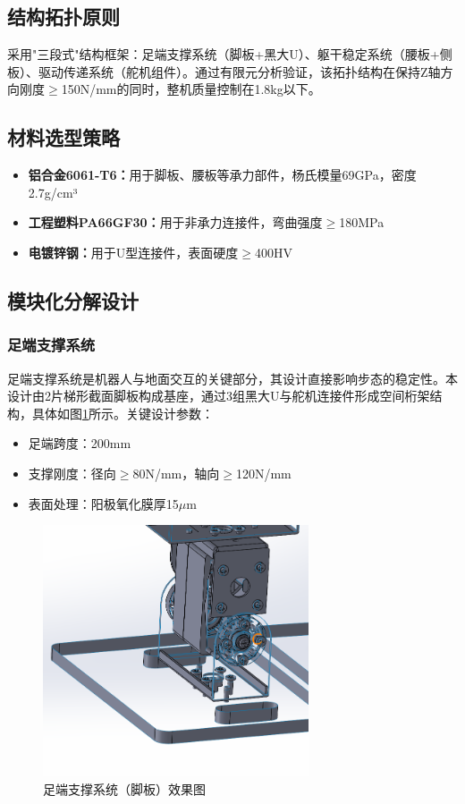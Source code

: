\documentclass[a4paper,fontset=windows]{ctexart}
\providecommand{\tightlist}{%
  \setlength{\itemsep}{0pt}\setlength{\parskip}{0pt}}
\begin{document}
\subsection{结构拓扑原则}
采用"三段式"结构框架：足端支撑系统（脚板+黑大U）、躯干稳定系统（腰板+侧板）、驱动传递系统（舵机组件）。通过有限元分析验证，该拓扑结构在保持Z轴方向刚度$\geq$150N/mm的同时，整机质量控制在1.8kg以下。
\subsection{材料选型策略}
\begin{itemize}
    \tightlist
    \item \textbf{铝合金6061-T6：}用于脚板、腰板等承力部件，杨氏模量69GPa，密度2.7g/cm³
    \item \textbf{工程塑料PA66GF30：}用于非承力连接件，弯曲强度$\geq$180MPa
    \item \textbf{电镀锌钢：}用于U型连接件，表面硬度$\geq$400HV
\end{itemize}
\subsection{模块化分解设计}
\subsubsection{足端支撑系统}
足端支撑系统是机器人与地面交互的关键部分，其设计直接影响步态的稳定性。本设计由2片梯形截面脚板构成基座，通过3组黑大U与舵机连接件形成空间桁架结构，具体如图\ref{fig:foot}所示。关键设计参数：
\begin{itemize}
    \tightlist
    \item 足端跨度：200mm
    \item 支撑刚度：径向$\geq$80N/mm，轴向$\geq$120N/mm
    \item 表面处理：阳极氧化膜厚15$\mu$m
\end{itemize}

\begin{figure}[H]
    \centering
    \includegraphics[width=0.7\textwidth]{脚板部分效果图.png}
    \caption{足端支撑系统（脚板）效果图}
    \label{fig:foot}
\end{figure}
\end{document}
